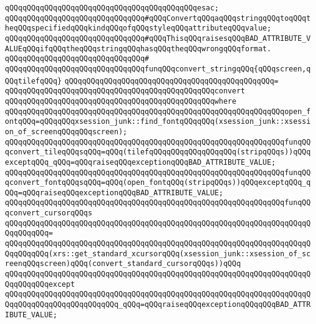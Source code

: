\verb|qQQqqQQqqQQqqQQqqQQqqQQqqQQqqQQqqQQqqQQqqQQqesac;|\newline
\newline
\verb|qQQqqQQqqQQqqQQqqQQqqQQqqQQqqQQq#qQQqConvertqQQqaqQQqstringqQQqtoqQQqtheqQQqspecifiedqQQqkindqQQqofqQQqstyleqQQqattributeqQQqvalue;|\newline
\verb|qQQqqQQqqQQqqQQqqQQqqQQqqQQqqQQq#qQQqThisqQQqraisesqQQqBAD_ATTRIBUTE_VALUEqQQqifqQQqtheqQQqstringqQQqhasqQQqtheqQQqwrongqQQqformat.|\newline
\verb|qQQqqQQqqQQqqQQqqQQqqQQqqQQqqQQq#|\newline
\verb|qQQqqQQqqQQqqQQqqQQqqQQqqQQqqQQqfunqQQqconvert_stringqQQq{qQQqscreen,qQQqtilefqQQq}|\newline
\verb|qQQqqQQqqQQqqQQqqQQqqQQqqQQqqQQqqQQqqQQqqQQqqQQq=|\newline
\verb|qQQqqQQqqQQqqQQqqQQqqQQqqQQqqQQqqQQqqQQqqQQqqQQqconvert|\newline
\verb|qQQqqQQqqQQqqQQqqQQqqQQqqQQqqQQqqQQqqQQqqQQqqQQqwhere|\newline
\verb|qQQqqQQqqQQqqQQqqQQqqQQqqQQqqQQqqQQqqQQqqQQqqQQqqQQqqQQqqQQqqQQqopen_fontqQQq=qQQqqQQqxsession_junk::find_fontqQQqqQQq(xsession_junk::xsession_of_screenqQQqqQQqscreen);|\newline
\newline
\verb|qQQqqQQqqQQqqQQqqQQqqQQqqQQqqQQqqQQqqQQqqQQqqQQqqQQqqQQqqQQqqQQqfunqQQqconvert_tileqQQqsqQQq=qQQq(tilefqQQqqQQqqQQqqQQqqQQq(stripqQQqs))qQQqexceptqQQq_qQQq=qQQqraiseqQQqexceptionqQQqBAD_ATTRIBUTE_VALUE;|\newline
\verb|qQQqqQQqqQQqqQQqqQQqqQQqqQQqqQQqqQQqqQQqqQQqqQQqqQQqqQQqqQQqqQQqfunqQQqconvert_fontqQQqsqQQq=qQQq(open_fontqQQq(stripqQQqs))qQQqexceptqQQq_qQQq=qQQqraiseqQQqexceptionqQQqBAD_ATTRIBUTE_VALUE;|\newline
\newline
\verb|qQQqqQQqqQQqqQQqqQQqqQQqqQQqqQQqqQQqqQQqqQQqqQQqqQQqqQQqqQQqqQQqfunqQQqconvert_cursorqQQqs|\newline
\verb|qQQqqQQqqQQqqQQqqQQqqQQqqQQqqQQqqQQqqQQqqQQqqQQqqQQqqQQqqQQqqQQqqQQqqQQqqQQqqQQq=|\newline
\verb|qQQqqQQqqQQqqQQqqQQqqQQqqQQqqQQqqQQqqQQqqQQqqQQqqQQqqQQqqQQqqQQqqQQqqQQqqQQqqQQq(xrs::get_standard_xcursorqQQq(xsession_junk::xsession_of_screenqQQqscreen)qQQq(convert_standard_cursorqQQqs))qQQq|\newline
\verb|qQQqqQQqqQQqqQQqqQQqqQQqqQQqqQQqqQQqqQQqqQQqqQQqqQQqqQQqqQQqqQQqqQQqqQQqqQQqqQQqexcept|\newline
\verb|qQQqqQQqqQQqqQQqqQQqqQQqqQQqqQQqqQQqqQQqqQQqqQQqqQQqqQQqqQQqqQQqqQQqqQQqqQQqqQQqqQQqqQQqqQQqqQQq_qQQq=qQQqraiseqQQqexceptionqQQqqQQqBAD_ATTRIBUTE_VALUE;|\newline
